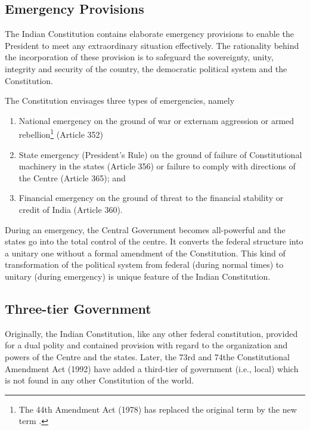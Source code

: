 \subsection{Emergency Provisions}

The Indian Constitution contains elaborate emergency provisions to enable the President to meet any extraordinary situation effectively. The rationality behind the incorporation of these provision is to safeguard the sovereignty, unity, integrity and security of the country, the democratic political system and the Constitution.

The Constitution envisages three types of emergencies, namely

\renewcommand{\labelenumi}{\textbf{(\alph{enumi})}}
\begin{enumerate}
  \item National emergency on the ground of war or externam aggression or armed rebellion\footnote{The 44th Amendment Act (1978) has replaced the original term  by the new term .} (Article 352)
  \item State emergency (President's Rule) on the ground of failure of Constitutional machinery in the states (Article 356) or failure to comply with directions of the Centre (Article 365); and
  \item Financial emergency on the ground of threat to the financial stability or credit of India (Article 360).
\end{enumerate}

During an emergency, the Central Government becomes all-powerful and the states go into the total control of the centre. It converts the federal structure into a unitary one without a formal amendment of the Constitution. This kind of transformation of the political system from federal (during normal times) to unitary (during emergency) is unique feature of the Indian Constitution.

\subsection{Three-tier Government}

Originally, the Indian Constitution, like any other federal constitution, provided for a dual polity and contained provision with regard to the organization and powers of the Centre and the states. Later, the 73rd and 74the Constitutional Amendment Act (1992) have added a third-tier of government (i.e., local) which is not found in any other Constitution of the world.

